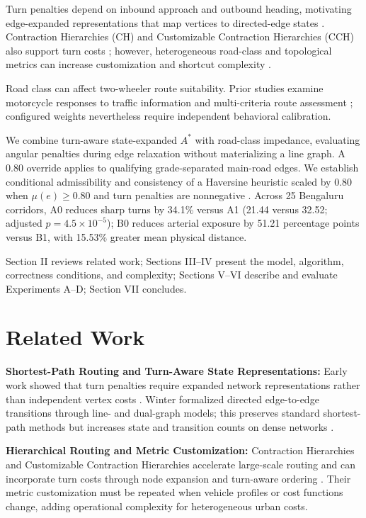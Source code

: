 \documentclass[11pt,conference]{IEEEtran}
\begin{document}
Turn penalties depend on inbound approach and outbound heading, motivating edge-expanded representations that map vertices to directed-edge states \cite{winter2002modeling,kirby1969minimum}. Contraction Hierarchies (CH) and Customizable Contraction Hierarchies (CCH) also support turn costs \cite{geisberger2011efficient,bast2016route}; however, heterogeneous road-class and topological metrics can increase customization and shortcut complexity \cite{bast2016route}.

Road class can affect two-wheeler route suitability. Prior studies examine motorcycle responses to traffic information and multi-criteria route assessment \cite{fadilah2024identifying,asvial2020entropy}; configured weights nevertheless require independent behavioral calibration.

We combine turn-aware state-expanded $A^*$ with road-class impedance, evaluating angular penalties during edge relaxation without materializing a line graph. A $0.80$ override applies to qualifying grade-separated main-road edges. We establish conditional admissibility and consistency of a Haversine heuristic scaled by $0.80$ when $\mu(e)\ge0.80$ and turn penalties are nonnegative \cite{hart1968formal}. Across 25 Bengaluru corridors, A0 reduces sharp turns by 34.1\% versus A1 (21.44 versus 32.52; adjusted $p=4.5\times10^{-5}$); B0 reduces arterial exposure by 51.21 percentage points versus B1, with 15.53\% greater mean physical distance.

Section II reviews related work; Sections III--IV present the model, algorithm, correctness conditions, and complexity; Sections V--VI describe and evaluate Experiments A--D; Section VII concludes.

\section{Related Work}

\noindent\textbf{Shortest-Path Routing and Turn-Aware State Representations:} Early work showed that turn penalties require expanded network representations rather than independent vertex costs \cite{kirby1969minimum}. Winter formalized directed edge-to-edge transitions through line- and dual-graph models; this preserves standard shortest-path methods but increases state and transition counts on dense networks \cite{winter2002modeling}.

\noindent\textbf{Hierarchical Routing and Metric Customization:} Contraction Hierarchies and Customizable Contraction Hierarchies accelerate large-scale routing and can incorporate turn costs through node expansion and turn-aware ordering \cite{geisberger2011efficient,bast2016route,delling2017customizable}. Their metric customization must be repeated when vehicle profiles or cost functions change, adding operational complexity for heterogeneous urban costs.
\end{document}

